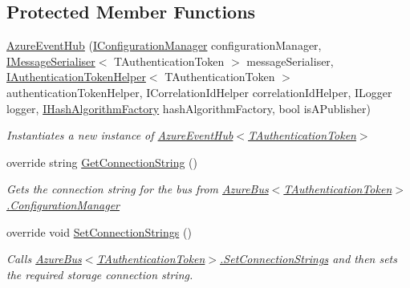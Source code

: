 \subsection*{Protected Member Functions}
\begin{DoxyCompactItemize}
\item 
\hyperlink{classCqrs_1_1Azure_1_1ServiceBus_1_1AzureEventHub_a2b548165ac5b1e3d0312af5c62e3c6cd_a2b548165ac5b1e3d0312af5c62e3c6cd}{Azure\+Event\+Hub} (\hyperlink{interfaceCqrs_1_1Configuration_1_1IConfigurationManager}{I\+Configuration\+Manager} configuration\+Manager, \hyperlink{interfaceCqrs_1_1Azure_1_1ServiceBus_1_1IMessageSerialiser}{I\+Message\+Serialiser}$<$ T\+Authentication\+Token $>$ message\+Serialiser, \hyperlink{interfaceCqrs_1_1Authentication_1_1IAuthenticationTokenHelper}{I\+Authentication\+Token\+Helper}$<$ T\+Authentication\+Token $>$ authentication\+Token\+Helper, I\+Correlation\+Id\+Helper correlation\+Id\+Helper, I\+Logger logger, \hyperlink{interfaceCqrs_1_1Bus_1_1IHashAlgorithmFactory}{I\+Hash\+Algorithm\+Factory} hash\+Algorithm\+Factory, bool is\+A\+Publisher)
\begin{DoxyCompactList}\small\item\em Instantiates a new instance of \hyperlink{classCqrs_1_1Azure_1_1ServiceBus_1_1AzureEventHub_a2b548165ac5b1e3d0312af5c62e3c6cd_a2b548165ac5b1e3d0312af5c62e3c6cd}{Azure\+Event\+Hub$<$\+T\+Authentication\+Token$>$} \end{DoxyCompactList}\item 
override string \hyperlink{classCqrs_1_1Azure_1_1ServiceBus_1_1AzureEventHub_a9855633b53ed1f67863ef9dffad0812c_a9855633b53ed1f67863ef9dffad0812c}{Get\+Connection\+String} ()
\begin{DoxyCompactList}\small\item\em Gets the connection string for the bus from \hyperlink{classCqrs_1_1Azure_1_1ServiceBus_1_1AzureBus_aaf9469d220fb23cb0521fa76b25ab228_aaf9469d220fb23cb0521fa76b25ab228}{Azure\+Bus$<$\+T\+Authentication\+Token$>$.\+Configuration\+Manager} \end{DoxyCompactList}\item 
override void \hyperlink{classCqrs_1_1Azure_1_1ServiceBus_1_1AzureEventHub_af823e573f3acc3fa9949969499309db1_af823e573f3acc3fa9949969499309db1}{Set\+Connection\+Strings} ()
\begin{DoxyCompactList}\small\item\em Calls \hyperlink{classCqrs_1_1Azure_1_1ServiceBus_1_1AzureBus_a8a1be9145b0a92c0037ef1b8b4cc79d9_a8a1be9145b0a92c0037ef1b8b4cc79d9}{Azure\+Bus$<$\+T\+Authentication\+Token$>$.\+Set\+Connection\+Strings} and then sets the required storage connection string. \end{DoxyCompactList}\item 

\end{DoxyCompactItemize}
